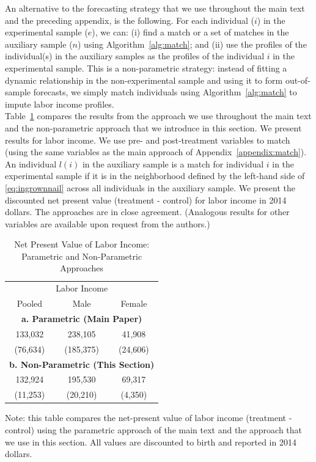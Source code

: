\noindent An alternative to the forecasting strategy that we use throughout the main text and the preceding appendix, is the following. For each individual ($i$) in the experimental sample ($e$), we can: (i) find a match or a set of matches in the auxiliary sample ($n$) using Algorithm~\ref{alg:match}; and (ii) use the profiles of the individual(s) in the auxiliary samples as the profiles of the individual $i$ in the experimental sample. This is a non-parametric strategy: instead of fitting a dynamic relationship in the non-experimental sample and using it to form out-of-sample forecasts, we simply match individuals using Algorithm~\ref{alg:match} to impute labor income profiles.\\

\noindent Table~\ref{table:nvpli} compares the results from the approach we use throughout the main text and the non-parametric approach that we introduce in this section. We present results for labor income. We use pre- and post-treatment variables to match (using the same variables as the main approach of Appendix~\ref{appendix:match}). An individual $l(i)$ in the auxiliary sample is a match for individual $i$ in the experimental sample if it is in the neighborhood defined by the left-hand side of \eqref{eq:ingrownnail} across all individuals in the auxiliary sample. We present the discounted net present value (treatment - control) for labor income in 2014 dollars. The approaches are in close agreement. (Analogous results for other variables are available upon request from the authors.)\\

\begin{table}[H]
\begin{threeparttable}
\caption{Net Present Value of Labor Income: Parametric and Non-Parametric Approaches}
\label{table:nvpli}
\centering
\begin{tabular}{ccc} \toprule
\multicolumn{3}{c}{Labor Income} \\
Pooled & Male & Female \\ \midrule
\multicolumn{3}{c}{\textbf{a. Parametric (Main Paper)}} \\
133,032 & 238,105 & 41,908 \\
(76,634) & (185,375) & (24,606) \\
\multicolumn{3}{c}{\textbf{b. Non-Parametric (This Section)}} \\
132,924 & 195,530 & 69,317 \\
(11,253) & (20,210) & (4,350) \\ \bottomrule
\end{tabular}
\begin{tablenotes}
\footnotesize
\item Note: this table compares the net-present value of labor income (treatment - control) using the parametric approach of the main text and the approach that we use in this section. All values are discounted to birth and reported in 2014 dollars.
\end{tablenotes}
\end{threeparttable}
\end{table}

